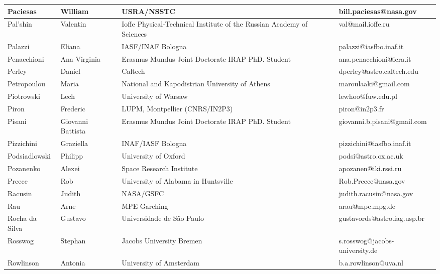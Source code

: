 \begin{center}
\begin{longtable}{|p{1.6cm} |p{1.6cm} |p{2cm} |p{3cm} |}
\tiny Paciesas &\tiny William & \tiny USRA/NSSTC & \tiny bill.paciesas@nasa.gov \\ \hline
\tiny Pal'shin &\tiny Valentin & \tiny Ioffe Physical-Technical Institute of the Russian Academy of Sciences & \tiny val@mail.ioffe.ru \\ \hline
\tiny Palazzi &\tiny Eliana & \tiny IASF/INAF Bologna & \tiny palazzi@iasfbo.inaf.it \\ \hline
\tiny Penacchioni &\tiny Ana Virginia & \tiny Erasmus Mundus Joint Doctorate IRAP PhD. Student & \tiny ana.penacchioni@icra.it \\ \hline
\tiny Perley &\tiny Daniel & \tiny Caltech & \tiny dperley@astro.caltech.edu \\ \hline
\tiny Petropoulou &\tiny Maria & \tiny National and Kapodistrian University of Athens & \tiny maroulaaki@gmail.com \\ \hline
\tiny Piotrowski &\tiny Lech & \tiny University of Warsaw & \tiny lewhoo@fuw.edu.pl \\ \hline
\tiny Piron &\tiny Frederic & \tiny LUPM, Montpellier (CNRS/IN2P3) & \tiny piron@in2p3.fr \\ \hline
\tiny Pisani &\tiny Giovanni Battista & \tiny Erasmus Mundus Joint Doctorate IRAP PhD. Student & \tiny giovanni.b.pisani@gmail.com \\ \hline
\tiny Pizzichini &\tiny Graziella & \tiny INAF/IASF Bologna & \tiny pizzichini@iasfbo.inaf.it \\ \hline
\tiny Podsiadlowski &\tiny Philipp & \tiny University of Oxford & \tiny podsi@astro.ox.ac.uk \\ \hline
\tiny Pozanenko &\tiny Alexei & \tiny Space Research Institute & \tiny apozanen@iki.rssi.ru \\ \hline
\tiny Preece &\tiny Rob & \tiny University of Alabama in Huntsville & \tiny Rob.Preece@nasa.gov \\ \hline
\tiny Racusin &\tiny Judith & \tiny NASA/GSFC & \tiny judith.racusin@nasa.gov \\ \hline
\tiny Rau &\tiny Arne & \tiny MPE Garching & \tiny arau@mpe.mpg.de \\ \hline
\tiny Rocha da Silva &\tiny Gustavo & \tiny Universidade de S\~{a}o Paulo & \tiny gustavords@astro.iag.usp.br \\ \hline
\tiny Rosswog &\tiny Stephan & \tiny Jacobs University Bremen & \tiny s.rosswog@jacobs-university.de \\ \hline
\tiny Rowlinson &\tiny Antonia & \tiny University of Amsterdam & \tiny b.a.rowlinson@uva.nl \\ \hline

\end{longtable}
\end{center}
